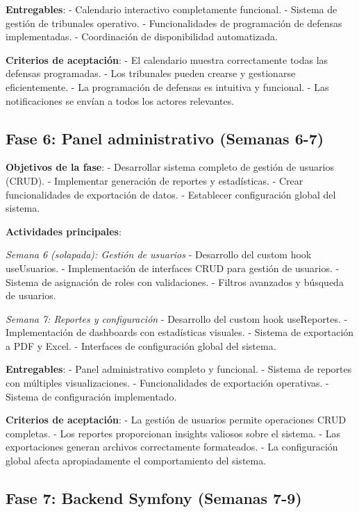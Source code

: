 \documentclass[12pt,a4paper,oneside]{report}
\begin{document}
\textbf{Entregables}: - Calendario interactivo completamente funcional.
- Sistema de gestión de tribunales operativo. - Funcionalidades de
programación de defensas implementadas. - Coordinación de disponibilidad
automatizada.

\textbf{Criterios de aceptación}: - El calendario muestra correctamente
todas las defensas programadas. - Los tribunales pueden crearse y
gestionarse eficientemente. - La programación de defensas es intuitiva y
funcional. - Las notificaciones se envían a todos los actores
relevantes.

\subsection{Fase 6: Panel administrativo (Semanas
6-7)}\label{fase-6-panel-administrativo-semanas-6-7}

\textbf{Objetivos de la fase}: - Desarrollar sistema completo de gestión
de usuarios (CRUD). - Implementar generación de reportes y estadísticas.
- Crear funcionalidades de exportación de datos. - Establecer
configuración global del sistema.

\textbf{Actividades principales}:

\emph{Semana 6 (solapada): Gestión de usuarios} - Desarrollo del custom
hook useUsuarios. - Implementación de interfaces CRUD para gestión de
usuarios. - Sistema de asignación de roles con validaciones. - Filtros
avanzados y búsqueda de usuarios.

\emph{Semana 7: Reportes y configuración} - Desarrollo del custom hook
useReportes. - Implementación de dashboards con estadísticas visuales. -
Sistema de exportación a PDF y Excel. - Interfaces de configuración
global del sistema.

\textbf{Entregables}: - Panel administrativo completo y funcional. -
Sistema de reportes con múltiples visualizaciones. - Funcionalidades de
exportación operativas. - Sistema de configuración implementado.

\textbf{Criterios de aceptación}: - La gestión de usuarios permite
operaciones CRUD completas. - Los reportes proporcionan insights
valiosos sobre el sistema. - Las exportaciones generan archivos
correctamente formateados. - La configuración global afecta
apropiadamente el comportamiento del sistema.

\subsection{Fase 7: Backend Symfony (Semanas
7-9)}\label{fase-7-backend-symfony-semanas-7-9}
\end{document}

